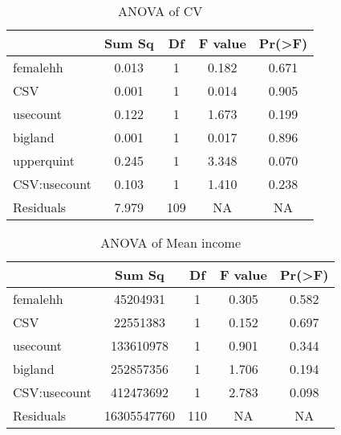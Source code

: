 \documentclass[
]{article}
\begin{document}
\begin{table}

\caption{\label{tab:tableuse}ANOVA of CV}
\centering
\begin{tabular}[t]{lcccc}
\toprule
  & Sum Sq & Df & F value & Pr(>F)\\
\midrule
femalehh & 0.013 & 1 & 0.182 & 0.671\\
 
CSV & 0.001 & 1 & 0.014 & 0.905\\
 
usecount & 0.122 & 1 & 1.673 & 0.199\\
 
bigland & 0.001 & 1 & 0.017 & 0.896\\
 
upperquint & 0.245 & 1 & 3.348 & 0.070\\
 
CSV:usecount & 0.103 & 1 & 1.410 & 0.238\\
 
Residuals & 7.979 & 109 & NA & NA\\
\bottomrule
\end{tabular}
\end{table}

\begin{table}

\caption{\label{tab:tableuse}ANOVA of Mean income}
\centering
\begin{tabular}[t]{lcccc}
\toprule
  & Sum Sq & Df & F value & Pr(>F)\\
\midrule
femalehh & 45204931 & 1 & 0.305 & 0.582\\
 
CSV & 22551383 & 1 & 0.152 & 0.697\\
 
usecount & 133610978 & 1 & 0.901 & 0.344\\
 
bigland & 252857356 & 1 & 1.706 & 0.194\\
 
CSV:usecount & 412473692 & 1 & 2.783 & 0.098\\
 
Residuals & 16305547760 & 110 & NA & NA\\
\bottomrule
\end{tabular}
\end{table}
\end{document}

